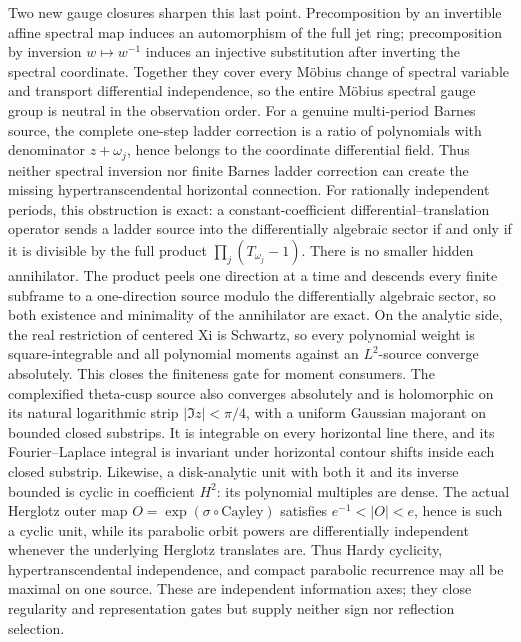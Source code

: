 \documentclass[11pt]{article}
\theoremstyle{definition}
\theoremstyle{remark}
\begin{document}
Two new gauge closures sharpen this last point.  Precomposition by an
invertible affine spectral map induces an automorphism of the full jet ring;
precomposition by inversion \(w\mapsto w^{-1}\) induces an injective
substitution after inverting the spectral coordinate.  Together they cover
every M\"obius change of spectral variable and transport differential
independence, so the entire M\"obius spectral gauge group is neutral in the
observation order.  For a genuine multi-period Barnes source, the complete one-step
ladder correction is a ratio of polynomials with denominator
\(z+\omega_j\), hence belongs to the coordinate differential field.  Thus
neither spectral inversion nor finite Barnes ladder correction can create
the missing hypertranscendental horizontal connection.  For rationally
independent periods, this obstruction is exact: a
constant-coefficient differential--translation operator sends a ladder
source into the differentially algebraic sector if and only if it is
divisible by the full product \(\prod_j(T_{\omega_j}-1)\).  There is no
smaller hidden annihilator.  The product peels one direction at a time and
descends every finite subframe to a one-direction source modulo the
differentially algebraic sector, so both existence and minimality of the
annihilator are exact.  On the analytic side, the real restriction of
centered Xi is Schwartz, so every polynomial
weight is square-integrable and all polynomial moments against an
\(L^2\)-source converge absolutely.  This closes the finiteness gate for
moment consumers.  The complexified theta-cusp source also converges
absolutely and is holomorphic on its natural logarithmic strip
\(|\Im z|<\pi/4\), with a uniform Gaussian majorant on bounded closed
substrips.  It is integrable on every horizontal line there, and its
Fourier--Laplace integral is invariant under horizontal contour shifts
inside each closed substrip.  Likewise, a disk-analytic unit with both it
and its inverse bounded is cyclic in coefficient \(H^2\): its polynomial
multiples are dense.  The actual Herglotz outer map
\(O=\exp(\sigma\circ\mathrm{Cayley})\) satisfies
\(e^{-1}<|O|<e\), hence is such a cyclic unit, while its parabolic orbit
powers are differentially independent whenever the underlying Herglotz
translates are.  Thus Hardy cyclicity, hypertranscendental independence, and
compact parabolic recurrence may all be maximal on one source.  These are
independent information axes; they close regularity and representation gates
but supply neither sign nor reflection selection.
\end{document}
